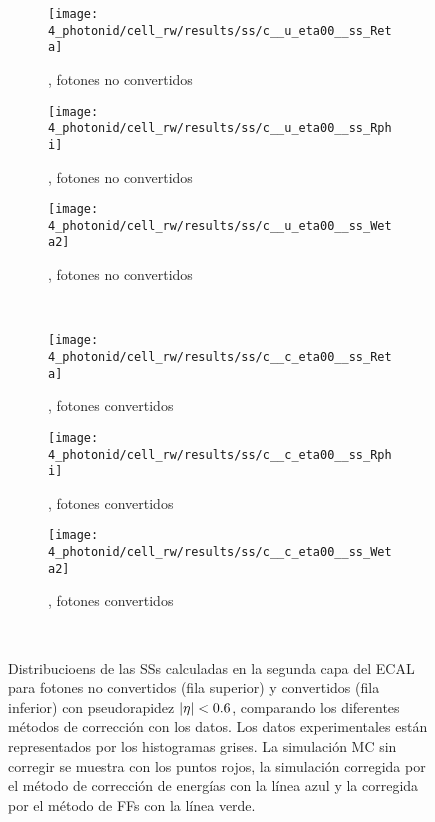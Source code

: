 \begin{figure}[ht!]
    \centering
    \begin{subfigure}[h]{0.32\linewidth}
        \centering
        \texttt{[image: 4\_photonid/cell\_rw/results/ss/c\_\_u\_eta00\_\_ss\_Reta]}
        \caption{\reta, fotones no convertidos}
    \end{subfigure}
    \hfill
    \begin{subfigure}[h]{0.32\linewidth}
        \centering
        \texttt{[image: 4\_photonid/cell\_rw/results/ss/c\_\_u\_eta00\_\_ss\_Rphi]}
        \caption{\rphi, fotones no convertidos}
    \end{subfigure}
    \begin{subfigure}[h]{0.32\linewidth}
        \centering
        \texttt{[image: 4\_photonid/cell\_rw/results/ss/c\_\_u\_eta00\_\_ss\_Weta2]}
        \caption{\weta, fotones no convertidos}
    \end{subfigure}\\
    \begin{subfigure}[h]{0.32\linewidth}
        \centering
        \texttt{[image: 4\_photonid/cell\_rw/results/ss/c\_\_c\_eta00\_\_ss\_Reta]}
        \caption{\reta, fotones convertidos}
    \end{subfigure}
    \hfill
    \begin{subfigure}[h]{0.32\linewidth}
        \centering
        \texttt{[image: 4\_photonid/cell\_rw/results/ss/c\_\_c\_eta00\_\_ss\_Rphi]}
        \caption{\rphi, fotones convertidos}
    \end{subfigure}
    \begin{subfigure}[h]{0.32\linewidth}
        \centering
        \texttt{[image: 4\_photonid/cell\_rw/results/ss/c\_\_c\_eta00\_\_ss\_Weta2]}
        \caption{\weta, fotones convertidos}
    \end{subfigure}\\
    \caption{Distribucioens de las \acp{SS} calculadas en la segunda capa del \ac{ECAL} para fotones no convertidos (fila superior) y convertidos (fila inferior) con pseudorapidez \(|\eta|<0.6\), comparando los diferentes m\'etodos de correcci\'on con los datos. Los datos experimentales est\'an representados por los histogramas grises. La simulaci\'on \ac{MC} sin corregir se muestra con los puntos rojos, la simulaci\'on corregida por el m\'etodo de correcci\'on de energ\'ias con la l\'inea azul y la corregida por el m\'etodo de \acp{FF} con la l\'inea verde.}
    \label{fig:ss_corrections:cell_rw:results:ss}
\end{figure}






